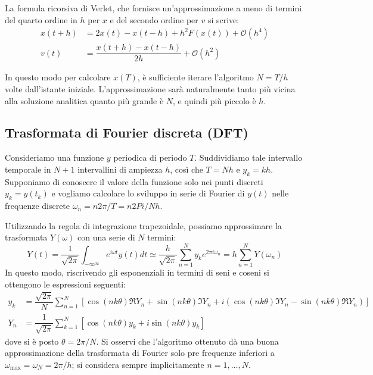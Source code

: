 \documentclass[italian,a4paper]{article}
\newcommand{\w}{\omega}
\begin{document}
La formula ricorsiva di Verlet, che fornisce un'approssimazione a meno di termini del quarto ordine in $h$ per $x$ e del secondo ordine per $v$ si scrive:
\begin{align*}
x(t+h)&= 2 x(t) -x(t-h) + h^2 F(x(t)) +\mathcal{O}(h^4)\\
v(t)&=\dfrac{x(t+h)-x(t-h)}{2h} +\mathcal{O}(h^2)
\end{align*}

In questo modo per calcolare $x(T)$, \`e sufficiente iterare l'algoritmo $N=T/h$ volte dall'istante iniziale. L'approssimazione sar\`a naturalmente tanto pi\`u vicina alla soluzione analitica quanto pi\`u grande \`e $N$, e quindi pi\`u piccolo \`e $h$.

\subsection*{Trasformata di Fourier discreta (DFT)}
Consideriamo una funzione $y$ periodica di periodo $T$. Suddividiamo tale intervallo temporale in $N+1$ intervallini di ampiezza $h$, cos\`i che $T=Nh$ e $y_k=kh$. 
Supponiamo di conoscere il valore della funzione solo nei punti discreti $y_k=y(t_k)$ e vogliamo calcolare lo sviluppo in serie di Fourier di $y(t)$ nelle frequenze discrete $\w_n=n 2\pi/T=n 2Pi/Nh$. 

Utilizzando la regola di integrazione trapezoidale, possiamo approssimare la trasformata $Y(\w)$ con una serie di $N$ termini:
\begin{equation*}
Y(t)=\dfrac{1}{\sqrt{2\pi}}\int_{-\infty^\infty}{e^{i\w t}y(t)dt} \simeq \dfrac{h}{\sqrt{2\pi}}\sum_{n=1}^{N}{y_k e^{2\pi i\w_n}}=h\sum_{n=1}^N{Y(\w_n)}
\end{equation*}
In questo modo, riscrivendo gli esponenziali in termini di seni e coseni si ottengono le espressioni seguenti:
\begin{align*}
y_k&=\dfrac{\sqrt{2\pi}}{N}\sum_{n=1}^N{\left[\cos(nk\theta)\Re Y_n+\sin(nk\theta)\Im Y_n + i\left(\cos(nk\theta)\Im Y_n - \sin(nk\theta)\Re Y_n\right)\right]}\\
Y_n&=\dfrac{1}{\sqrt{2\pi}}\sum_{k=1}^N{\left[\cos(nk\theta)y_k+i\sin(nk\theta)y_k\right]}
\end{align*}
dove si \`e posto $\theta=2\pi/N$. Si osservi che l'algoritmo ottenuto d\`a una buona approssimazione della trasformata di Fourier solo pre frequenze inferiori a $\w_{\max}=\w_N=2\pi/h$; si considera sempre implicitamente $n=1,\dots, N$.
\end{document}
